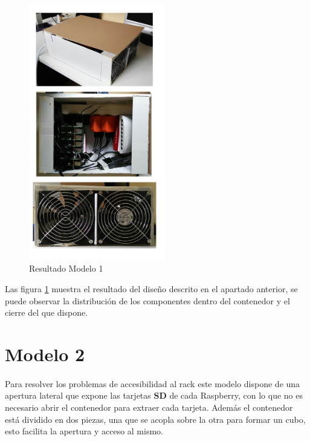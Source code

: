\begin{figure}[H]
	\centering
  	\includegraphics[width=60mm]{Modelos/M1Res.jpg}
   	\caption[Resultado Modelo 1]{Resultado Modelo 1}
   \label{figure4.2}
\end{figure}

Las figura \ref{figure4.2} muestra el resultado del diseño descrito en el apartado anterior, se puede observar la distribución de los componentes dentro del contenedor y el cierre del que dispone.

\section{Modelo 2}
\label{makereference4.4}
\paragraph{}

Para resolver los problemas de accesibilidad al rack este modelo dispone de una apertura lateral que expone las tarjetas \textbf{SD} de cada Raspberry, con lo que no es necesario abrir el contenedor para extraer cada tarjeta.
Además el contenedor está dividido en dos piezas, una que se acopla sobre la otra para formar un cubo, esto facilita la apertura y acceso al mismo.

